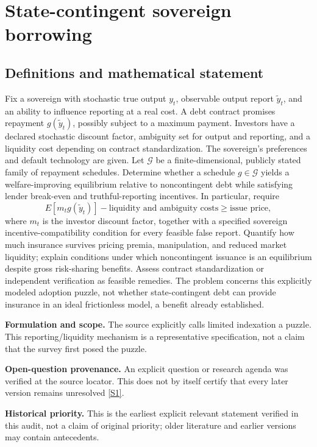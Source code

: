 \documentclass[11pt]{article}
\newcommand{\sref}[2]{\hyperlink{source:#1:#2}{[S#2]}}
\begin{document}
\section*{State-contingent sovereign borrowing}\label{30007539}
\subsection{Definitions and mathematical statement}
Fix a sovereign with stochastic true output \(y_t\), observable output report \(\tilde y_t\), and an ability to influence reporting at a real cost. A debt contract promises repayment \(g(\tilde y_t)\), possibly subject to a maximum payment. Investors have a declared stochastic discount factor, ambiguity set for output and reporting, and a liquidity cost depending on contract standardization. The sovereign’s preferences and default technology are given. Let \(\mathcal G\) be a finite-dimensional, publicly stated family of repayment schedules.
Determine whether a schedule \(g\in\mathcal G\) yields a welfare-improving equilibrium relative to noncontingent debt while satisfying lender break-even and truthful-reporting incentives. In particular, require
\[
E[m_t g(\tilde y_t)]-\text{liquidity and ambiguity costs}\ge \text{issue price},
\]
where \(m_t\) is the investor discount factor, together with a specified sovereign incentive-compatibility condition for every feasible false report. Quantify how much insurance survives pricing premia, manipulation, and reduced market liquidity; explain conditions under which noncontingent issuance is an equilibrium despite gross risk-sharing benefits. Assess contract standardization or independent verification as feasible remedies. The problem concerns this explicitly modeled adoption puzzle, not whether state-contingent debt can provide insurance in an ideal frictionless model, a benefit already established.

\par\textbf{Formulation and scope.} The source explicitly calls limited indexation a puzzle. This reporting/liquidity mechanism is a representative specification, not a claim that the survey first posed the puzzle.

\par\textbf{Open-question provenance.} An explicit question or research agenda was verified at the source locator. This does not by itself certify that every later version remains unresolved \sref{30007539}{1}.

\par\textbf{Historical priority.} This is the earliest explicit relevant statement verified in this audit, not a claim of original priority; older literature and earlier versions may contain antecedents.
\end{document}
